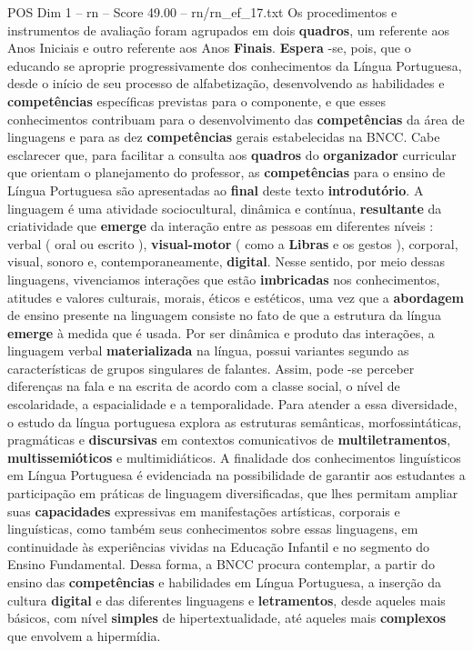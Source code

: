\begin{textsample}{POS Dim 1 – rn – Score 49.00 – rn/rn\_ef\_17.txt}
Os procedimentos e instrumentos de avaliação foram agrupados em dois \textbf{quadros}, um referente aos Anos Iniciais e outro referente aos Anos \textbf{Finais}. \textbf{Espera} -se, pois, que o educando se aproprie progressivamente dos conhecimentos da Língua Portuguesa, desde o início de seu processo de alfabetização, desenvolvendo as habilidades e \textbf{competências} específicas previstas para o componente, e que esses conhecimentos contribuam para o desenvolvimento das \textbf{competências} da área de linguagens e para as dez \textbf{competências} gerais estabelecidas na BNCC.
Cabe esclarecer que, para facilitar a consulta aos \textbf{quadros} do \textbf{organizador} curricular que orientam o planejamento do professor, as \textbf{competências} para o ensino de Língua Portuguesa são apresentadas ao \textbf{final} deste texto \textbf{introdutório}.
A linguagem é uma atividade sociocultural, dinâmica e contínua, \textbf{resultante} da criatividade que \textbf{emerge} da interação entre as pessoas em diferentes níveis : verbal ( oral ou escrito ), \textbf{visual-motor} ( como a \textbf{Libras} e os gestos ), corporal, visual, sonoro e, contemporaneamente, \textbf{digital}.
Nesse sentido, por meio dessas linguagens, vivenciamos interações que estão \textbf{imbricadas} nos conhecimentos, atitudes e valores culturais, morais, éticos e estéticos, uma vez que a \textbf{abordagem} de ensino presente na linguagem consiste no fato de que a estrutura da língua \textbf{emerge} à medida que é usada.
Por ser dinâmica e produto das interações, a linguagem verbal \textbf{materializada} na língua, possui variantes segundo as características de grupos singulares de falantes.
Assim, pode -se perceber diferenças na fala e na escrita de acordo com a classe social, o nível de escolaridade, a espacialidade e a temporalidade.
Para atender a essa diversidade, o estudo da língua portuguesa explora as estruturas semânticas, morfossintáticas, pragmáticas e \textbf{discursivas} em contextos comunicativos de \textbf{multiletramentos}, \textbf{multissemióticos} e multimidiáticos.
A finalidade dos conhecimentos linguísticos em Língua Portuguesa é evidenciada na possibilidade de garantir aos estudantes a participação em práticas de linguagem diversificadas, que lhes permitam ampliar suas \textbf{capacidades} expressivas em manifestações artísticas, corporais e linguísticas, como também seus conhecimentos sobre essas linguagens, em continuidade às experiências vividas na Educação Infantil e no segmento do Ensino Fundamental.
Dessa forma, a BNCC procura contemplar, a partir do ensino das \textbf{competências} e habilidades em Língua Portuguesa, a inserção da cultura \textbf{digital} e das diferentes linguagens e \textbf{letramentos}, desde aqueles mais básicos, com nível \textbf{simples} de hipertextualidade, até aqueles mais \textbf{complexos} que envolvem a hipermídia.

\end{textsample}
